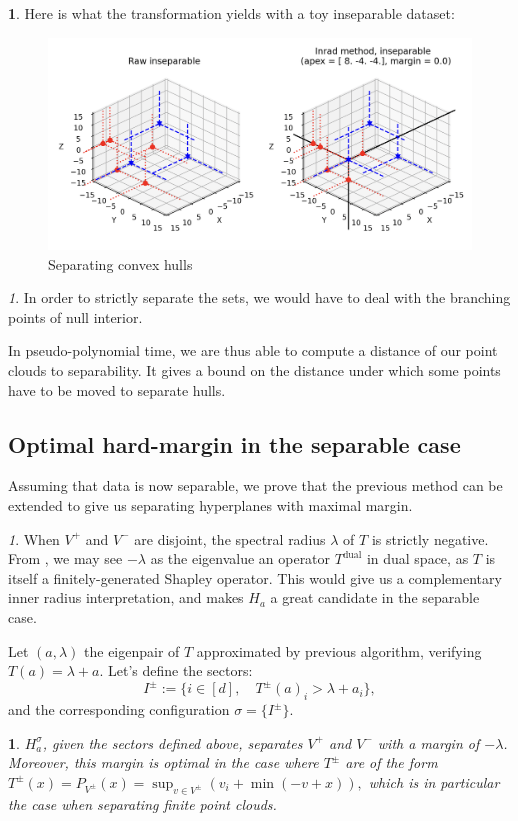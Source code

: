 \documentclass[oneside,english]{amsart}
\numberwithin{equation}{section}
\numberwithin{figure}{section}
\theoremstyle{plain}
\theoremstyle{definition}
\theoremstyle{plain}
\newtheorem{prop}[thm]{\protect\propositionname}
\theoremstyle{remark}
\newtheorem{rem}[thm]{\protect\remarkname}
\theoremstyle{plain}
\theoremstyle{definition}
\newtheorem{example}[thm]{\protect\examplename}
\theoremstyle{definition}
\providecommand{\propositionname}{Proposition}
\providecommand{\remarkname}{Remark}
\providecommand{\examplename}{Example}
\begin{document}
\newpage
\begin{example}

Here is what the transformation yields with a toy inseparable dataset:

\begin{figure}[!h]
\includegraphics[scale=0.4]{fig/inseparable} \caption{Separating convex hulls}
\end{figure}
\end{example}

\begin{rem}
In order to strictly separate the sets, we would have to deal with
the branching points of null interior. 
\end{rem}

In pseudo-polynomial time, we are thus able to compute a distance
of our point clouds to separability. It gives a bound on the distance
under which some points have to be moved to separate hulls.

\subsection{Optimal hard-margin in the separable case}

Assuming that data is now separable, we prove that the previous method
can be extended to give us separating hyperplanes with maximal margin. 
\begin{rem}
When $V^{+}$ and $V^{-}$ are disjoint, the spectral radius $\lambda$
of $T$ is strictly negative. From \cite{AKIAN2021}, we may see $-\lambda$
as the eigenvalue an operator $T^{\text{dual}}$ in dual space, as
$T$ is itself a finitely-generated Shapley operator. This would give
us a complementary inner radius interpretation, and makes $H_{a}$
a great candidate in the separable case. 
\end{rem}

Let $(a,\lambda)$ the eigenpair of $T$ approximated by previous
algorithm, verifying $T(a)=\lambda+a$. Let's define the sectors:
\[
I^{\pm}:=\{i\in[d],\quad T^{\pm}(a)_{i}>\lambda+a_{i}\},
\]
and the corresponding configuration $\sigma=\{I^{\pm}\text{\}}.$
\begin{prop}
$H_{a}^{\sigma}$, given the sectors defined above, separates $V^{+}$
and $V^{-}$ with a margin of $-\lambda$. Moreover, this margin is
optimal in the case where $T^{\pm}$ are of the form $T^{\pm}(x)=P_{V^{\pm}}(x)=\sup_{v\in V^{\pm}}\left(v_{i}+\min(-v+x)\right),$
which is in particular the case when separating finite point clouds. 
\end{prop}
\end{document}
